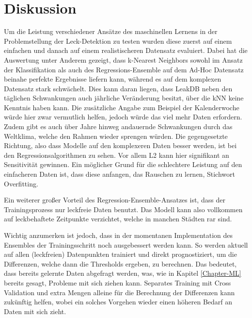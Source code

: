 \section{Diskussion \label{Chapter-Discussion}}

Um die Leistung verschiedener Ansätze des maschinellen Lernens in der Problemstellung der Leck-Detektion zu
 testen wurden diese zuerst auf einem einfachen und danach auf einem realistischeren Datensatz evaluiert. Dabei
 hat die Auswertung unter Anderem gezeigt, dass k-Nearest Neighbors sowohl im Ansatz der Klassifikation als auch
 des Regressions-Ensemble auf dem Ad-Hoc Datensatz beinahe perfekte Ergebnisse liefern kann, während es auf dem
 komplexen Datensatz stark schwächelt. Dies kann daran liegen, dass LeakDB neben den täglichen Schwankungen
 auch jährliche Veränderung besitzt, über die kNN keine Kenntnis haben kann. Die zusätzliche Angabe zum Beispiel
 der Kalenderwoche würde hier zwar vermutlich helfen, jedoch würde das viel mehr Daten erfordern. Zudem gibt es
 auch über Jahre hinweg andauernde Schwankungen durch das Weltklima, welche den Rahmen wieder sprengen würden.
 Die gegengesetzte Richtung, also dass Modelle auf den komplexeren Daten besser werden, ist bei den
 Regressionsalgorithmen zu sehen. Vor allem L2 kann hier signifikant an Sensitivität gewinnen. Ein möglicher
 Grund für die schlechtere Leistung auf den einfacheren Daten ist, dass diese anfangen, das Rauschen zu lernen,
 Stichwort Overfitting.

Ein weiterer großer Vorteil des Regression-Ensemble-Ansatzes ist, dass der Trainingsprozess nur leckfreie Daten
 benutzt. Das Modell kann also vollkommen auf leckbehaftete Zeitpunkte verzichtet, welche in manchen Städten rar
 sind.

Wichtig anzumerken ist jedoch, dass in der momentanen Implementation des Ensembles der Trainingsschritt noch
 ausgebessert werden kann. So werden aktuell auf allen (leckfreien) Datenpunkten trainiert und direkt
 prognostiziert, um die Differenzen, welche dann die Thresholds ergeben, zu berechnen. Das bedeutet, dass
 bereits gelernte Daten abgefragt werden, was, wie in Kapitel \ref{Chapter-ML} bereits gesagt, Probleme mit
 sich ziehen kann. Separates Training mit Cross Validation und extra Mengen alleine für die Berechnung der
 Differenzen kann zukünftig helfen, wobei ein solches Vorgehen wieder einen höheren Bedarf an Daten mit sich zieht.


